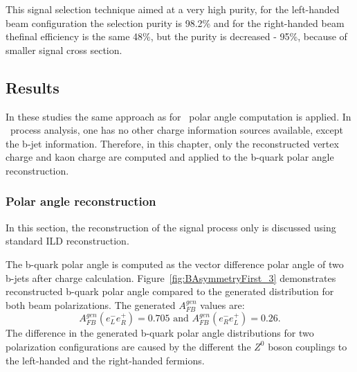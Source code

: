 

This signal selection technique  aimed at a very high purity, for the left-handed beam configuration the selection purity is 98.2\% and for the right-handed beam thefinal efficiency is the same 48\%, but the purity is decreased - 95\%, because of smaller signal cross section.




\subsection{Results}
\label{sec:BBBarresults}
In these studies the same approach as for \ttbar\ polar angle computation is applied. In \bbbar\ process analysis, one has no other charge information sources available, except the b-jet information. 
Therefore, in this chapter, only the reconstructed vertex charge and kaon charge are computed and applied to the b-quark polar angle reconstruction. 

\subsubsection{Polar angle reconstruction}
In this section, the reconstruction of the signal process only is discussed using standard ILD reconstruction. %

The b-quark polar angle is computed as the vector difference polar angle of two b-jets after charge calculation. 
Figure~\ref{fig:BAsymmetryFirst_3} demonstrates reconstructed b-quark polar angle compared to the generated distribution for both beam polarizations. 
The generated $A_{FB}^{gen}$ values are:
\begin{equation}
	A_{FB}^{gen}(e^-_L e^+_R) = 0.705\text{ and }A_{FB}^{gen}(e^-_R e^+_L) = 0.26.
\end{equation} 
The difference in the generated b-quark polar angle distributions for two polarization configurations are caused by the different the $Z^0$ boson couplings to the left-handed and the right-handed fermions. 

